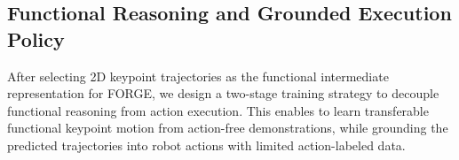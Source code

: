 



\subsection{Functional Reasoning and Grounded Execution Policy}
\label{sec:FORGE}
After selecting 2D keypoint trajectories as the functional intermediate representation for FORGE, we design a two-stage training strategy to decouple functional reasoning from action execution.
This enables \algoname{} to learn transferable functional keypoint motion from action-free demonstrations, while grounding the predicted trajectories into robot actions with limited action-labeled data.

